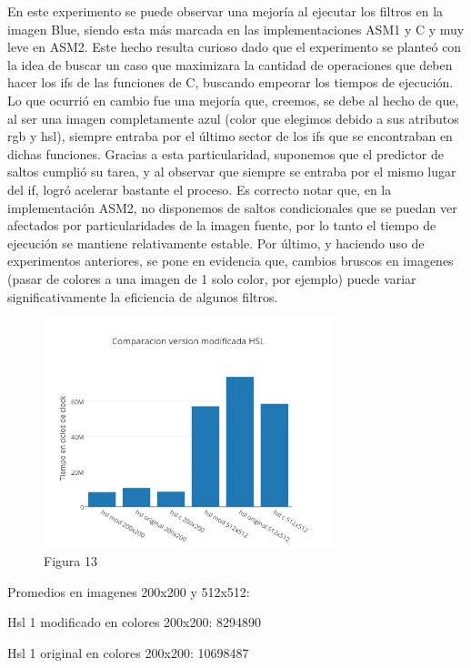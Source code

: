\documentclass[a4paper]{article}
\begin{document}
En este experimento se puede observar una mejoría al ejecutar los filtros en la imagen Blue, siendo esta más marcada en las implementaciones ASM1 y C y muy leve en ASM2. Este hecho resulta curioso dado que el experimento se planteó con la idea de buscar un caso que maximizara la cantidad de operaciones que deben hacer los ifs de las funciones de C, buscando empeorar los tiempos de ejecución. Lo que ocurrió en cambio fue una mejoría que, creemos, se debe al hecho de que, al ser una imagen completamente azul (color que elegimos debido a sus atributos rgb y hsl), siempre entraba por el último sector de los ifs que se encontraban en dichas funciones. Gracias a esta particularidad, suponemos que el predictor de saltos cumplió su tarea, y al observar que siempre se entraba por el mismo lugar del if, logró acelerar bastante el proceso.
Es correcto notar que, en la implementación ASM2, no disponemos de saltos condicionales que se puedan ver afectados por particularidades de la imagen fuente, por lo tanto el tiempo de ejecución se mantiene relativamente estable.
Por último, y haciendo uso de experimentos anteriores, se pone en evidencia que, cambios bruscos en imagenes (pasar de colores a una imagen de 1 solo color, por ejemplo) puede variar significativamente la eficiencia de algunos filtros.


\begin{figure}[h]
  \centering
    \includegraphics[width=0.75\textwidth]{imagenes/ComparacionVersionModificadaHSL.png}
  \caption{Figura 13}
  \label{fig:graficohsl7}
\end{figure}
 \FloatBarrier

Promedios en imagenes 200x200 y 512x512:

Hsl 1 modificado en colores 200x200: 8294890

Hsl 1 original en colores 200x200:  10698487
\end{document}
